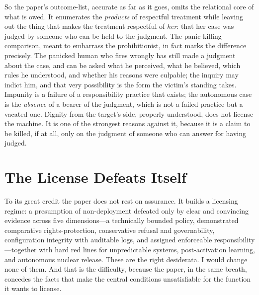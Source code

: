 \documentclass[11pt]{article}
\begin{document}
So the paper's outcome-list, accurate as far as it goes, omits the relational core of what is owed. It enumerates the \emph{products} of respectful treatment while leaving out the thing that makes the treatment respectful of \emph{her}: that her case was judged by someone who can be held to the judgment. The panic-killing comparison, meant to embarrass the prohibitionist, in fact marks the difference precisely. The panicked human who fires wrongly has still made a judgment about the case, and can be asked what he perceived, what he believed, which rules he understood, and whether his reasons were culpable; the inquiry may indict him, and that very possibility is the form the victim's standing takes. Impunity is a failure of a responsibility practice that exists; the autonomous case is the \emph{absence} of a bearer of the judgment, which is not a failed practice but a vacated one. Dignity from the target's side, properly understood, does not license the machine. It is one of the strongest reasons against it, because it is a claim to be killed, if at all, only on the judgment of someone who can answer for having judged.

\section{The License Defeats Itself}
\label{sec:license}

To its great credit the paper does not rest on assurance. It builds a licensing regime: a presumption of non-deployment defeated only by clear and convincing evidence across five dimensions---a technically bounded policy, demonstrated comparative rights-protection, conservative refusal and governability, configuration integrity with auditable logs, and assigned enforceable responsibility---together with hard red lines for unpredictable systems, post-activation learning, and autonomous nuclear release. These are the right desiderata. I would change none of them. And that is the difficulty, because the paper, in the same breath, concedes the facts that make the central conditions unsatisfiable for the function it wants to license.
\end{document}
